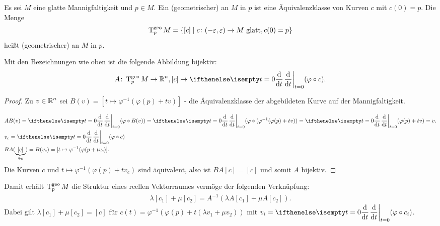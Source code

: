 \begin{dfn}
  Es sei $M$ eine glatte Mannigfaltigkeit und $p \in M$. Ein (geometrischer)  an $M$ in $p$ ist eine Äquivalenzklasse von Kurven $c$ mit $c(0) = p$. Die Menge
  \begin{align*}
    \operatorname{T}_{p}^{\text{geo}}M = \{ [c] \mid c \colon (-\varepsilon,\varepsilon) \to M \text{ glatt}, c(0) = p\}
  \end{align*}
  heißt (geometrischer)  an $M$ in $p$.
\end{dfn}

\begin{bem}
  Mit den Bezeichnungen wie oben ist die folgende Abbildung bijektiv:
  \begin{align*}
    A \colon \T_p^{\text{geo}}M \to \R^n, [c] \mapsto \difffrac[t=0]{}{t}(\varphi \circ c).
  \end{align*}
\end{bem}

\begin{proof}
  Zu $v \in \operatorname{\mathbb{R}}^n$ sei $B(v) = [t \mapsto \varphi^{-1}(\varphi(p) + tv)]$ - die Äquivalenzklasse der abgebildeten Kurve auf der Mannigfaltigkeit.


  \begin{align*}
    & A B(v) = \difffrac[t=0]{}{t}(\varphi \circ B(v)) = \difffrac[t=0]{}{t}(\varphi \circ (\varphi^{-1}(\varphi(p) + tv)) = \difffrac[t=0]{}{t}(\varphi(p) + tv) = v.\\
    & v_c = \difffrac[t=0]{}{t}(\varphi \circ c)\\
    & B A (\underbrace{[c]}_{\ni c}) = B(v_c) = [t \mapsto \varphi^{-1}(\varphi(p + tv_c)].
  \end{align*}
  Die Kurven $c$ und $t \mapsto \varphi^{-1}(\varphi(p) + tv_c)$ sind äquivalent, also ist $B A[c] = [c]$ und somit $A$ bijektiv.
\end{proof}

Damit erhält $\operatorname{T}_p^{\text{geo}}M$ die Struktur eines reellen Vektorraumes vermöge der folgenden Verknüpfung:
\begin{align*}
  \lambda[c_1] + \mu[c_2] = A^{-1}(\lambda A[c_1]+ \mu A[c_2]).
\end{align*}
Dabei gilt $\lambda[c_1]+\mu[c_2] = [c]$ für $c(t) = \varphi^{-1}(\varphi(p) + t(\lambda v_1 + \mu v_2))$ mit $v_i = \difffrac[t=0]{}{t}(\varphi \circ c_i)$.

